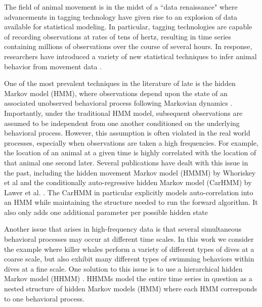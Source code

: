 

The field of animal movement is in the midst of a ``data renaissance" where advancements in tagging technology have given rise to an explosion of data available for statistical modeling. In particular, tagging technologies are capable of recording observations at rates of tens of hertz, resulting in time series containing millions of observations over the course of several hours. In response, researchers have introduced a variety of new statistical techniques to infer animal behavior from movement data \citep{Hooten:2017}. 

One of the most prevalent techniques in the literature of late is the hidden Markov model (HMM), where observations depend upon the state of an associated unobserved behavioral process following Markovian dynamics \citep{Patterson:2017}. Importantly, under the traditional HMM model, subsequent observations are assumed to be independent from one another conditioned on the underlying behavioral process. However, this assumption is often violated in the real world processes, especially when observations are taken a high frequencies. For example, the location of an animal at a given time is highly correlated with the location of that animal one second later. Several publications have dealt with this issue in the past, including the hidden movement Markov model (HMMM) by Whoriskey et al \citep{Whoriskey:2016} and the conditionally auto-regressive hidden Markov model (CarHMM) by Lawer et al. \citep{Lawler:2019}. The CarHMM in particular explicitly models auto-correlation into an HMM while maintaining the structure needed to run the forward algorithm. It also only adds one additional parameter per possible hidden state 

Another issue that arises in high-frequency data is that several simultaneous behavioral processes may occur at different time scales. In this work we consider the example where killer whales perform a variety of different types of dives at a coarse scale, but also exhibit many different types of swimming behaviors within dives at a fine scale. One solution to this issue is to use a hierarchical hidden Markov model (HHMM) \citep{Barajas:2017} \citep{Adam:2019}. HHMMs model the entire time series in question as a nested structure of hidden Markov models (HMM) where each HMM corresponds to one behavioral process.

